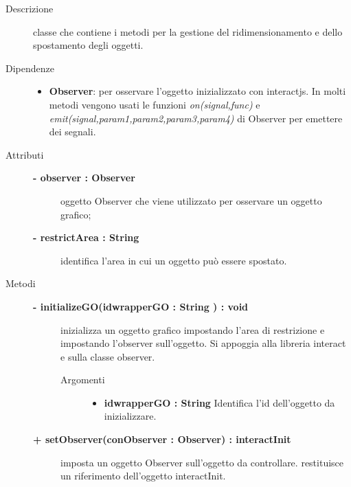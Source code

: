\begin{description}
\item[Descrizione] \hfill
	classe che contiene i metodi per la gestione del ridimensionamento e dello spostamento degli oggetti. 
	
	\item[Dipendenze] \hfill
	\begin{itemize}
		\item \textbf{Observer}: per osservare l'oggetto inizializzato con interactjs. In molti metodi vengono usati le funzioni \textit{on(signal,func)} e \textit{emit(signal,param1,param2,param3,param4)} di Observer per emettere dei segnali.
	\end{itemize}
	
\item[Attributi] \hfill
	\begin{description}
		\item[\textbf{- observer : Observer			}] \hfill
			oggetto Observer che viene utilizzato per osservare un oggetto grafico;
		\item[\textbf{- 	restrictArea : String		}] \hfill
			identifica l'area in cui un oggetto può essere spostato.
	\end{description}
	
	
\item[Metodi] \hfill

	\begin{description}
		\item[\textbf{\color{blue}- initializeGO(idwrapperGO : String	) : void		}] \hfill
			inizializza un oggetto grafico impostando l'area di restrizione e impostando l'observer sull'oggetto. Si appoggia alla libreria interact e sulla classe observer.
			
		\begin{description}
			\item[Argomenti] \hfill
				\begin{itemize}
				
					\item \textbf{idwrapperGO : String			} \hfill
						Identifica l'id dell'oggetto da inizializzare.
					
				\end{itemize}
		\end{description}
	\end{description}		

	\begin{description}
		\item[\textbf{\color{blue}+ setObserver(conObserver : Observer) : interactInit			}] \hfill
			imposta un oggetto Observer sull'oggetto da controllare. restituisce un riferimento dell'oggetto interactInit.
			

\end{description}
\end{description}
